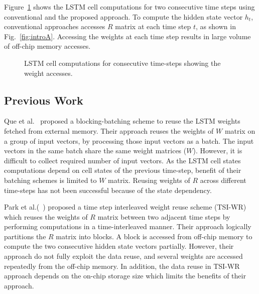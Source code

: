 \documentclass[a4paper,10pt]{article}
\begin{document}
Figure{~\ref{fig:introToApproach}} shows the LSTM cell computations for two consecutive time steps using  conventional and the proposed approach. To compute the hidden state vector $h_t$, conventional approaches accesses $R$ matrix at each time step $t$, as shown in Fig.{~\ref{fig:introA}}. Accessing the weights at each time step results in large volume of off-chip memory accesses. 
\begin{figure}[!htb]
	\centering
	\hfil
	\hfil	
	\caption{LSTM cell computations for consecutive time-steps showing the weight accesses.}
	\label{fig:introToApproach}
	\vspace{-1.0em}	
\end{figure}
\subsection{Previous Work}
Que et al.~\cite{que2019efficient} proposed a blocking-batching scheme to reuse the LSTM weights fetched from external memory. Their approach reuses the weights of $W$ matrix on a group of input vectors, by processing those input vectors as a batch. The input vectors in the same batch share the same weight matrices ($W$). However, it is difficult to collect required number of input vectors. As the LSTM cell states computations depend on cell states of the previous time-step, benefit of their batching schemes is limited to $W$ matrix. Reusing weights of $R$ across different time-steps has not been successful because of the state dependency.

Park et al.(~\cite{park2020time}) proposed a time step interleaved weight reuse scheme (TSI-WR) which reuses the weights of $R$ matrix between two adjacent time steps by performing computations in a time-interleaved manner. Their approach logically partitions the $R$ matrix into blocks. A block is accessed from off-chip memory to compute the two consecutive hidden state vectors partially. However, their approach do not fully exploit the data reuse, and several weights are accessed repeatedly from the off-chip memory. In addition, the data reuse in TSI-WR approach depends on the on-chip storage size which limits the benefits of their approach.
\end{document}
